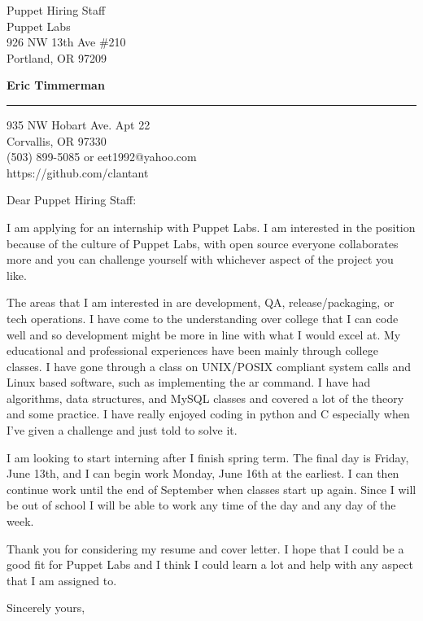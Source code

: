 \documentclass{letter} %
\begin{document}
\signature{Eric Timmerman}           %
\longindentation=0pt                       %
\let\raggedleft\raggedright                %
 
 
\begin{letter}{Puppet Hiring Staff \\
Puppet Labs \\
926 NW 13th Ave \#210 \\
Portland, OR 97209}

\begin{center}
{\large\bf Eric Timmerman} 
\end{center}
\medskip\hrule height 1pt
\begin{center}
{935 NW Hobart Ave. Apt 22 \\   Corvallis, OR 97330 \\ (503) 899-5085 or eet1992@yahoo.com \\  https://github.com/clantant} 
\end{center} \vfill %
 
 
\opening{Dear Puppet Hiring Staff:} 
 
\noindent I am applying for an internship with Puppet Labs. I am interested in the position because of the culture of Puppet Labs, with open source everyone collaborates more and you can challenge yourself with whichever aspect of the project you like. 
 
\noindent The areas that I am interested in are development, QA, release/packaging, or tech operations. I have come to the understanding over college that I can code well and so development might be more in line with what I would excel at. My educational and professional experiences have been mainly through college classes. I have gone through a class on UNIX/POSIX compliant system calls and Linux based software, such as implementing the ar command. I have had algorithms, data structures, and MySQL classes and covered a lot of the theory and some practice. I have really enjoyed coding in python and C especially when I've given a challenge and just told to solve it.

\noindent I am looking to start interning after I finish spring term. The final day is Friday, June 13th, and I can begin work Monday, June 16th at the earliest. I can then continue work until the end of September when classes start up again. Since I will be out of school I will be able to work any time of the day and any day of the week. 

\noindent Thank you for considering my resume and cover letter. I hope that I could be a good fit for Puppet Labs and I think I could learn a lot and help with any aspect that I am assigned to.
 
\closing{Sincerely yours,} 
 

 

\end{letter}
 
\end{document}
